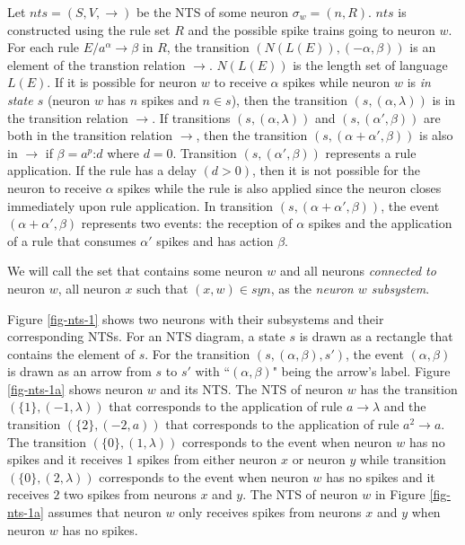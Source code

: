 \documentclass[]{elsarticle}
\theoremstyle{definition}
\theoremstyle{definition}
\newcommand{\ra}{\rightarrow}
\newcommand{\sm}{\text{:}}
\begin{document}

Let $nts = (S,V,\ra)$ be the NTS of some neuron $\sigma_w=(n,R)$. $nts$ is constructed using the 
rule set $R$ and the possible spike trains going to neuron $w$. For each rule $E/a^{\alpha} \ra 
\beta$ in $R$, the transition $(N(L(E)),(-\alpha, \beta))$ is an element of the transtion relation 
$\ra$. $N(L(E))$ is the length set of language $L(E)$. If it is possible for neuron $w$ to receive 
$\alpha$ spikes while neuron $w$ is \emph{in state $s$} (neuron $w$ has $n$ spikes and $n\in s$), 
then the transition $(s,(\alpha,\lambda))$ is in the transition relation $\ra$. If transitions 
$(s,(\alpha,\lambda))$ and $(s,(\alpha',\beta))$ are both in the transition relation $\ra$, then the 
transition $(s,(\alpha+\alpha', \beta))$ is also in $\ra$ if $\beta = a^p\sm d$ where $d=0$. 
Transition $(s,(\alpha',\beta))$ represents a rule application. If the rule has a delay $(d>0)$, 
then it is not possible for the neuron to receive $\alpha$ spikes while the rule is also applied 
since the neuron closes immediately upon rule application. In transition $(s,(\alpha+\alpha', 
\beta))$, the event $(\alpha+\alpha',\beta)$ represents two events: the reception of $\alpha$ spikes 
and the application of a rule that consumes $\alpha'$ spikes and has action $\beta$. 


We will call the set that contains some neuron $w$ 
and all neurons \emph{connected to} neuron $w$, all neuron $x$ such that $(x,w) \in syn$, as the 
\emph{neuron $w$ subsystem}. 


Figure \ref{fig-nts-1} shows two neurons with their subsystems and their corresponding NTSs. For an
NTS diagram, a state $s$ is drawn as a rectangle that contains the element of $s$. For the 
transition $(s,(\alpha,\beta),s')$, the event $(\alpha,\beta)$ is drawn as an arrow from $s$ to
$s'$ with ``$(\alpha,\beta)$" being the arrow's label. Figure \ref{fig-nts-1a} shows neuron $w$ and
its NTS. The NTS of neuron $w$ has the transition $(\{1\},(-1,\lambda))$ that corresponds to the
application of rule  $a\ra\lambda$ and the transition $(\{2\},(-2,a))$ that corresponds to the 
application of rule $a^2\ra a$. The transition $(\{0\},(1,\lambda))$ corresponds to the event when 
neuron $w$ has no spikes and it receives $1$ spikes from either neuron $x$ or neuron $y$ while 
transition $(\{0\},(2,\lambda))$ corresponds to the event when neuron $w$ has no spikes and it 
receives $2$ two spikes from neurons $x$ and $y$. The NTS of neuron $w$ in Figure \ref{fig-nts-1a}
assumes that neuron $w$ only receives spikes from neurons $x$ and $y$ when neuron $w$ has no spikes.
\end{document}
